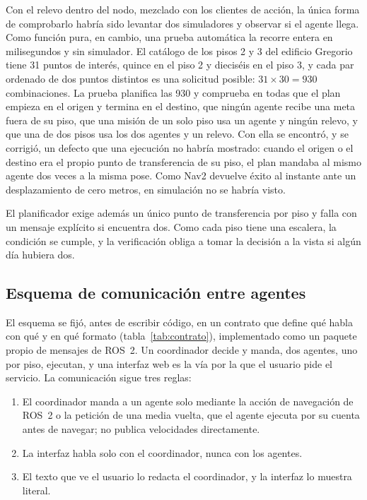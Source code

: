 Con el relevo dentro del nodo, mezclado con los clientes de acción, la única forma de comprobarlo habría sido levantar dos simuladores y observar si el agente llega. Como función pura, en cambio, una prueba automática la recorre entera en milisegundos y sin simulador. El catálogo de los pisos 2 y 3 del edificio Gregorio tiene 31 puntos de interés, quince en el piso 2 y dieciséis en el piso 3, y cada par ordenado de dos puntos distintos es una solicitud posible: $31 \times 30 = 930$ combinaciones. La prueba planifica las 930 y comprueba en todas que el plan empieza en el origen y termina en el destino, que ningún agente recibe una meta fuera de su piso, que una misión de un solo piso usa un agente y ningún relevo, y que una de dos pisos usa los dos agentes y un relevo. Con ella se encontró, y se corrigió, un defecto que una ejecución no habría mostrado: cuando el origen o el destino era el propio punto de transferencia de su piso, el plan mandaba al mismo agente dos veces a la misma pose. Como Nav2 devuelve éxito al instante ante un desplazamiento de cero metros, en simulación no se habría visto.

El planificador exige además un único punto de transferencia por piso y falla con un mensaje explícito si encuentra dos. Como cada piso tiene una escalera, la condición se cumple, y la verificación obliga a tomar la decisión a la vista si algún día hubiera dos.

\subsection{Esquema de comunicación entre agentes}
\label{sec:contrato}

El esquema se fijó, antes de escribir código, en un contrato que define qué habla con qué y en qué formato (tabla~\ref{tab:contrato}), implementado como un paquete propio de mensajes de ROS~2. Un coordinador decide y manda, dos agentes, uno por piso, ejecutan, y una interfaz web es la vía por la que el usuario pide el servicio. La comunicación sigue tres reglas:

\begin{enumerate}[leftmargin=*]
  \item El coordinador manda a un agente solo mediante la acción de navegación de ROS~2 o la petición de una media vuelta, que el agente ejecuta por su cuenta antes de navegar; no publica velocidades directamente.
  \item La interfaz habla solo con el coordinador, nunca con los agentes.
  \item El texto que ve el usuario lo redacta el coordinador, y la interfaz lo muestra literal.
\end{enumerate}

